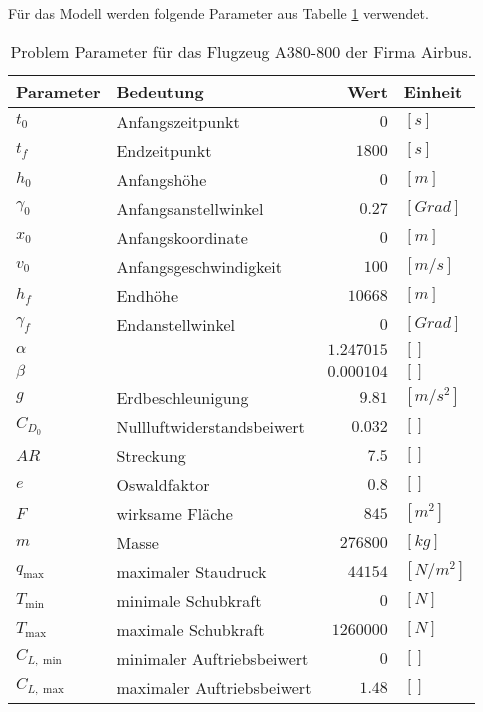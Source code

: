 Für das Modell werden folgende Parameter aus Tabelle \ref{tab:ProblemPara} verwendet.
\begin{table}[H]
    \begin{center}
        \caption{Problem Parameter für das Flugzeug A380-800 der Firma Airbus.}\label{tab:ProblemPara}
        \begin{tabular}{|l|l|r|l|}
            \hline
            Parameter & Bedeutung & Wert & Einheit \\ 
            \hline 
            \hline
            $t_0$ & Anfangszeitpunkt & $0$ & $[s]$ \\ 
            $t_f$ & Endzeitpunkt & $1800$ & $[s]$ \\ 
            \hline
            $h_0$ & Anfangshöhe & $0$ & $[m]$ \\ 
            $\gamma_0$ & Anfangsanstellwinkel & $0.27$ & $[Grad]$ \\
            $x_0$ & Anfangskoordinate & $0$ & $[m]$ \\ 
            $v_0$ & Anfangsgeschwindigkeit & $100$ & $[m/s]$ \\ 
            \hline
            $h_f$ & Endhöhe & $10668$ & $[m]$ \\ 
            $\gamma_f$ & Endanstellwinkel & $0$ & $[Grad]$ \\
            \hline
            $\alpha$ &  & $1.247015$ & $[]$ \\ 
            $\beta$ &  & $0.000104$ & $[]$ \\
            $g$ & Erdbeschleunigung & $9.81$ & $[m/s^2]$ \\ 
            $C_{D_0}$ & Nullluftwiderstandsbeiwert & $0.032$ & $[]$ \\ 
            $AR$ & Streckung & $7.5$ & $[]$ \\ 
            $e$ & Oswaldfaktor & $0.8$ & $[]$ \\ 
            $F$ & wirksame Fläche & $845$ & $[m^2]$ \\ 
            $m$ & Masse & $276800$ & $[kg]$ \\ 
            $q_{\max}$ & maximaler Staudruck & $44154$ & $[N/m^2]$ \\
            $T_{\min}$ & minimale Schubkraft & $0$ & $[N]$ \\  
            $T_{\max}$ & maximale Schubkraft & $1260000$ & $[N]$ \\ 
            $C_{L, \min}$ & minimaler Auftriebsbeiwert & $0$ & $[]$ \\ 
            $C_{L, \max}$ & maximaler Auftriebsbeiwert & $1.48$ & $[]$ \\ 
            \hline
        \end{tabular} 
    \end{center}
\end{table}


